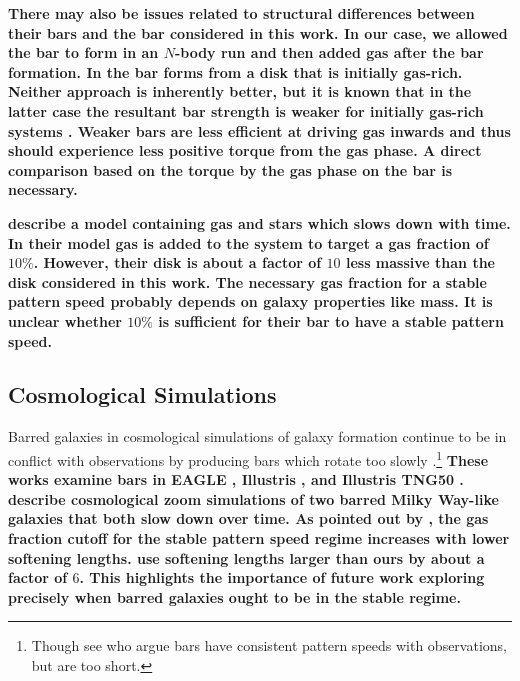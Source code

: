 \documentclass[twocolumn,linenumbers,trackchanges]{aastex631}
\begin{document}
{\bf There may also be issues related to structural differences between their
bars and the bar considered in this work. In our case, we allowed the bar to
form in an $N$-body run and then added gas after the bar formation. In
\citet{2013MNRAS.429.1949A, 2014MNRAS.438L..81A} the bar forms from a disk that
is initially gas-rich. Neither approach is inherently better, but it is known
that in the latter case the resultant bar strength is weaker for initially
gas-rich systems \citep[e.g.,][]{2013MNRAS.429.1949A}. Weaker bars are less
efficient at driving gas inwards \citep{2004ApJ...600..595R} and thus should
experience less positive torque from the gas phase. A direct comparison based on
the torque by the gas phase on the bar is necessary.}

{\bf \citet{2015MNRAS.454.3166A} describe a model containing gas and stars which
slows down with time. In their model gas is added to the system to target a gas
fraction of $10\%$. However, their disk is about a factor of $10$ less massive
than the disk considered in this work. The necessary gas fraction for a stable
pattern speed probably depends on galaxy properties like mass. It is unclear
whether $10\%$ is sufficient for their bar to have a stable pattern speed.}

\subsection{Cosmological Simulations}
Barred galaxies in cosmological simulations of galaxy formation continue to be
in conflict with observations by producing bars which rotate too slowly
\citep{2017MNRAS.469.1054A, 2019MNRAS.483.2721P, 2021AA...650L..16F,
2022ApJ...940...61F}.\footnote{Though see \citet{2022ApJ...940...61F} who argue
bars have consistent pattern speeds with observations, but are too short.} {\bf
These works examine bars in EAGLE \citep{2015MNRAS.450.1937C,
2015MNRAS.446..521S}, Illustris \citep{2014Natur.509..177V,
2014MNRAS.444.1518V}, and Illustris TNG50 \citep{2019MNRAS.490.3196P,
2019MNRAS.490.3234N}. \citet{2015PASJ...67...63O} describe cosmological zoom
simulations of two barred Milky Way-like galaxies that both slow down over time.
As pointed out by \citet{2010ApJ...719.1470V}, the gas fraction cutoff for the
stable pattern speed regime increases with lower softening lengths.
\citet{2015PASJ...67...63O} use softening lengths larger than ours by about a
factor of $6$. This highlights the importance of future work exploring precisely
when barred galaxies ought to be in the stable regime.}
\end{document}

